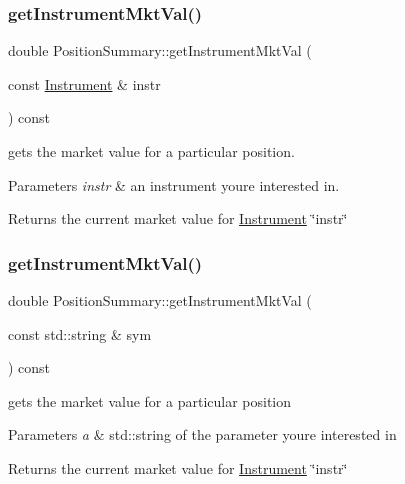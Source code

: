 \subsubsection{\texorpdfstring{get\+Instrument\+Mkt\+Val()}{getInstrumentMktVal()}\hspace{0.1cm}{\footnotesize\ttfamily [1/2]}}
{\footnotesize\ttfamily double Position\+Summary\+::get\+Instrument\+Mkt\+Val (\begin{DoxyParamCaption}\item[{const \hyperlink{classInstrument}{Instrument} \&}]{instr }\end{DoxyParamCaption}) const}



gets the market value for a particular position. 


\begin{DoxyParams}{Parameters}
{\em instr} & an instrument you\textquotesingle{}re interested in. \\
\hline
\end{DoxyParams}
\begin{DoxyReturn}{Returns}
the current market value for \hyperlink{classInstrument}{Instrument} \char`\"{}instr\char`\"{} 
\end{DoxyReturn}
\mbox{\label{classPositionSummary_a66ed8d8382b50aaca12fd889a2fd6c31}} 
\subsubsection{\texorpdfstring{get\+Instrument\+Mkt\+Val()}{getInstrumentMktVal()}\hspace{0.1cm}{\footnotesize\ttfamily [2/2]}}
{\footnotesize\ttfamily double Position\+Summary\+::get\+Instrument\+Mkt\+Val (\begin{DoxyParamCaption}\item[{const std\+::string \&}]{sym }\end{DoxyParamCaption}) const}



gets the market value for a particular position 


\begin{DoxyParams}{Parameters}
{\em a} & std\+::string of the parameter you\textquotesingle{}re interested in \\
\hline
\end{DoxyParams}
\begin{DoxyReturn}{Returns}
the current market value for \hyperlink{classInstrument}{Instrument} \char`\"{}instr\char`\"{} 
\end{DoxyReturn}
\mbox{\label{classPositionSummary_a9337188fb6f76eff2d72be77d30ac77a}} 
